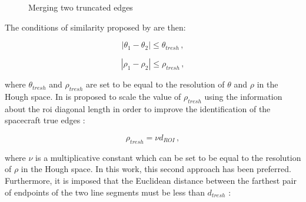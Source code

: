\begin{figure}[htbp]
  \centering
  \qquad
  \qquad
  \caption{Merging two truncated edges \cite{Sharma2018}}
  \label{fig:mergeEdges}
\end{figure}

The conditions of similarity proposed by \cite{Sharma2018} are then:

\begin{equation}
  |\theta_1 - \theta_2| \leqslant \theta_{tresh} \,,
\end{equation}

\begin{equation}
  |\rho_1 - \rho_2| \leqslant \rho_{tresh} \,,
\end{equation}

where $\theta_{tresh}$ and $\rho_{tresh}$ are set to be equal to the resolution of $\theta$ and $\rho$ in the Hough space. In \cite{fracchio2019} is proposed to scale the value of $\rho_{tresh}$ using the information about the \acrshort{roi} diagonal length in order to improve the identification of the spacecraft true edges :

\begin{equation}
  \rho_{tresh} = \nu d_{ROI} \,,
\end{equation}

where $\nu$ is a multiplicative constant which can be set to be equal to the resolution of $\rho$ in the Hough space. In this work, this second approach has been preferred.
Furthermore, it is imposed that the Euclidean distance between the farthest pair of endpoints of the two line segments must be less than $d_{tresh}$ :

